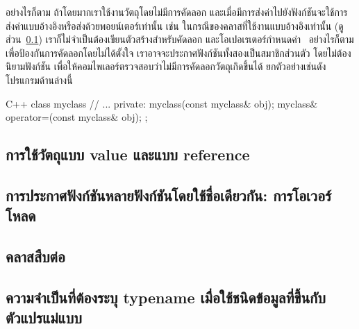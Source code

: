 อย่างไรก็ตาม ถ้า{\wbr}โดยมาก{\wbr}เรา{\wbr}ใช้{\wbr}งาน{\wbr}วัตถุ{\wbr}โดย{\wbr}ไม่{\wbr}มี{\wbr}การ{\wbr}คัดลอก{\wbr}
และ{\wbr}เมื่อ{\wbr}มี{\wbr}การ{\wbr}ส่ง{\wbr}ค่า{\wbr}ไป{\wbr}ยัง{\wbr}ฟังก์ชัน{\wbr}จะ{\wbr}ใช้{\wbr}การ{\wbr}ส่ง{\wbr}ค่า{\wbr}แบบ{\wbr}อ้างอิง{\wbr}หรือ{\wbr}ส่ง{\wbr}ด้วย{\wbr}พอยน์เตอร์{\wbr}เท่านั้น เช่น{\wbr}
ใน{\wbr}กรณี{\wbr}ของ{\wbr}ค{\wbr}ลา{\wbr}ส{\wbr}ที่{\wbr}ใช้{\wbr}งาน{\wbr}แบบ{\wbr}อ้างอิง{\wbr}เท่านั้น{\wbr}
(ดู{\wbr}ส่วน~\ref{section:abs-value-ref-semantics})
เรา{\wbr}ก็{\wbr}ไม่{\wbr}จำเป็น{\wbr}ต้อง{\wbr}เขียน{\wbr}ตัว{\wbr}สร้าง{\wbr}สำหรับ{\wbr}คัดลอก และ{\wbr}โอ{\wbr}เปอเรเตอร์{\wbr}กำหนด{\wbr}ค่า \ อย่างไรก็ตาม{\wbr}
เพื่อ{\wbr}ป้องกัน{\wbr}การ{\wbr}คัดลอก{\wbr}โดย{\wbr}ไม่{\wbr}ได้{\wbr}ตั้งใจ เรา{\wbr}อาจ{\wbr}จะ{\wbr}ประกาศ{\wbr}ฟังก์ชัน{\wbr}ทั้ง{\wbr}สอง{\wbr}เป็น{\wbr}สมาชิก{\wbr}ส่วนตัว{\wbr}
โดย{\wbr}ไม่{\wbr}ต้อง{\wbr}นิยาม{\wbr}ฟังก์ชัน เพื่อให้{\wbr}คอม{\wbr}ไพ{\wbr}เลอร์{\wbr}ตรวจสอบ{\wbr}ว่า{\wbr}ไม่{\wbr}มี{\wbr}การ{\wbr}คัดลอก{\wbr}วัตถุ{\wbr}เกิด{\wbr}ขึ้น{\wbr}ได้{\wbr}
ยก{\wbr}ตัวอย่าง{\wbr}เช่น{\wbr}ดัง{\wbr}โปรแกรม{\wbr}ด้าน{\wbr}ล่าง{\wbr}นี้{\wbr}

\latintext
\begin{codelist}{C++}{}
class myclass {
  // ...
private:
  myclass(const myclass& obj);
  myclass& operator=(const myclass& obj);
};
\end{codelist}
\thaitext

\subsection{การ{\wbr}ใช้{\wbr}วัตถุ{\wbr}แบบ value และ{\wbr}แบบ reference}
\label{section:abs-value-ref-semantics}

\subsection{การ{\wbr}ประกาศ{\wbr}ฟังก์ชัน{\wbr}หลาย{\wbr}ฟังก์ชัน{\wbr}โดย{\wbr}ใช้{\wbr}ชื่อ{\wbr}เดียวกัน: การ{\wbr}โอ{\wbr}เวอร์{\wbr}โหลด}

\subsection{ค{\wbr}ลา{\wbr}ส{\wbr}สืบต่อ}

\subsection{ความจำ{\wbr}เป็น{\wbr}ที่{\wbr}ต้อง{\wbr}ระบุ {\ct typename} เมื่อ{\wbr}ใช้{\wbr}ชนิด{\wbr}ข้อมูล{\wbr}ที่{\wbr}ขึ้น{\wbr}กับ{\wbr}ตัวแปร{\wbr}แม่แบบ}
\label{section:abs-typename}

